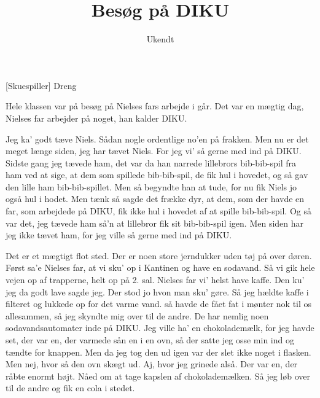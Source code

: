 \documentclass[a4paper,11pt]{article}
\title{Besøg på DIKU}
\author{Ukendt}
\begin{document}
\maketitle

\begin{roles}
[Skuespiller] Dreng
\end{roles}


\begin{sketch}


 Hele klassen var på besøg på Nielses fars arbejde i går. Det var en mægtig dag, Nielses far arbejder på noget, han kalder DIKU.


 Jeg ka' godt tæve Niels. Sådan nogle ordentlige no'en på frakken. Men nu er det meget længe siden, jeg har tævet Niels.
         For jeg vi' så gerne med ind på DIKU. Sidste gang jeg tævede ham, det var da han narrede lillebrors bib-bib-spil fra ham ved at sige,
         at dem som spillede bib-bib-spil, de fik hul i hovedet, og så gav den lille ham bib-bib-spillet. Men så begyndte han at tude,
         for nu fik Niels jo også hul i hodet. Men tænk så sagde det frække dyr, at dem, som der havde en far, som arbejdede på DIKU,
         fik ikke hul i hovedet af at spille bib-bib-spil. Og så var det, jeg tævede ham så'n at lillebror fik sit bib-bib-spil igen.
         Men siden har jeg ikke tævet ham, for jeg ville så gerne med ind på DIKU.


 Det er et mægtigt flot sted. Der er noen store jerndukker uden tøj på over døren.
         Først sa'e Nielses far, at vi sku' op i Kantinen og have en sodavand. Så vi gik hele vejen op af trapperne, helt op på 2. sal.
         Nielses far vi' helst have kaffe. Den ku' jeg da godt lave sagde jeg. Der stod jo hvon man sku' gøre.
         Så jeg hældte kaffe i filteret og lukkede op for det varme vand. så havde de fået fat i mønter nok til os allesammen,
         så jeg skyndte mig over til de andre. De har nemlig noen sodavandsautomater inde på DIKU. Jeg ville ha' en chokolademælk,
         for jeg havde set, der var en, der varmede sån en i en ovn, så der satte jeg osse min ind og tændte for knappen.
         Men da jeg tog den ud igen var der slet ikke noget i flasken. Men nej, hvor så den ovn skægt ud. Aj, hvor jeg grinede alså.
         Der var en, der råbte enormt højt. Nåed om at tage kapslen af chokolademælken. Så jeg løb over til de andre og fik en cola i stedet.


\end{sketch}
\end{document}
